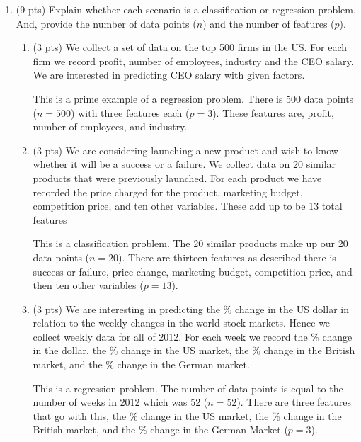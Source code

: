 \documentclass[a4paper]{article}
\theoremstyle{definition}
\newenvironment{soln}{
    \leavevmode\color{blue}\ignorespaces
}{}
\begin{document}
\begin{enumerate}
\item (9 pts) Explain whether each scenario is a classification or regression problem. And, provide the number of data points ($n$) and the number of features ($p$).

\begin{enumerate}
	\item (3 pts) We collect a set of data on the top 500 firms in the US. For each firm we record profit, number of employees, industry and the CEO salary. We are interested in predicting CEO salary with given factors.\\
	
	\begin{soln}
            This is a prime example of a regression problem. There is 500 data points ($n = 500$) with three features each ($p = 3$). These features are, profit, number of employees, and industry.
        \end{soln}\\
	
	\item (3 pts) We are considering launching a new product and wish to know whether it will be a success or a failure. We collect data on 20 similar products that were previously launched. For each product we have recorded the price charged for the product, marketing budget, competition price, and ten other variables. These add up to be 13 total features\\
	
	\begin{soln}
            This is a classification problem. The 20 similar products make up our 20 data points ($n = 20$). There are thirteen features as described there is success or failure, price change, marketing budget, competition price, and then ten other variables ($p = 13$).
        \end{soln}\\
	
	\item (3 pts) We are interesting in predicting the \% change in the US dollar in relation to the weekly changes in the world stock markets. Hence we collect weekly data for all of 2012. For each week we record the \% change in the dollar, the \% change in the US market, the \% change in the British market, and the \% change in the German market.\\
	
	\begin{soln}
            This is a regression problem. The number of data points is equal to the number of weeks in 2012 which was 52 ($n = 52$). There are three features that go with this, the \% change in the US market, the \% change in the British market, and the \% change in the German Market ($p = 3$).
        \end{soln}\\
	

\end{enumerate}
\end{enumerate}
\end{document}

